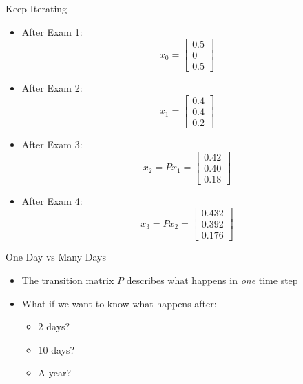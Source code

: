 \documentclass[10pt]{beamer}
\begin{document}
\begin{frame}{Keep Iterating}

\begin{itemize}
    
    \item After Exam 1:
        $$x_0 = \begin{bmatrix}
        0.5 \\0 \\ 0.5
    \end{bmatrix}$$

    \item After Exam 2:
    $$
    x_1=\begin{bmatrix}
        0.4 \\0.4\\0.2
    \end{bmatrix}
    $$

    \item After Exam 3:
        $$
    x_2=Px_1=\begin{bmatrix}
        0.42 \\0.40\\0.18
    \end{bmatrix}
    $$
    \item After Exam 4:
    $$
    x_3=Px_2=\begin{bmatrix}
        0.432 \\0.392\\0.176
    \end{bmatrix}
    $$
    
\end{itemize}
\end{frame}



\begin{frame}{One Day vs Many Days}
\begin{itemize}
    \item The transition matrix $P$ describes what happens in \emph{one} time step
    \item What if we want to know what happens after:
    \begin{itemize}
        \item 2 days?
        \item 10 days?
        \item A year?
    \end{itemize}
\end{itemize}

\end{frame}
\end{document}
